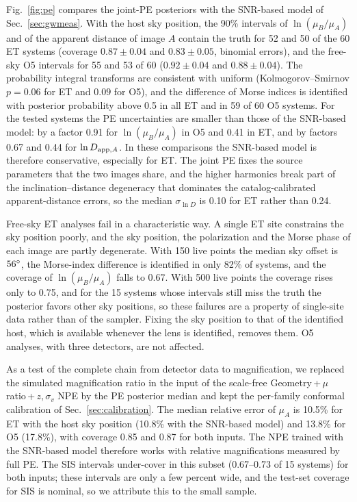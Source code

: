 Fig.~\ref{fig:pe} compares the joint-PE posteriors with the SNR-based model of Sec.~\ref{sec:gwmeas}. With the host sky position, the 90\% intervals of $\ln(\mu_B/\mu_A)$ and of the apparent distance of image $A$ contain the truth for 52 and 50 of the 60 ET systems (coverage $0.87\pm0.04$ and $0.83\pm0.05$, binomial errors), and the free-sky O5 intervals for 55 and 53 of 60 ($0.92\pm0.04$ and $0.88\pm0.04$). The probability integral transforms are consistent with uniform (Kolmogorov--Smirnov $p=0.06$ for ET and $0.09$ for O5), and the difference of Morse indices is identified with posterior probability above 0.5 in all ET and in 59 of 60 O5 systems. For the tested systems the PE uncertainties are smaller than those of the SNR-based model: by a factor 0.91 for $\ln(\mu_B/\mu_A)$ in O5 and 0.41 in ET, and by factors 0.67 and 0.44 for $\ln D_{{\rm app},A}$. In these comparisons the SNR-based model is therefore conservative, especially for ET. The joint PE fixes the source parameters that the two images share, and the higher harmonics break part of the inclination--distance degeneracy that dominates the catalog-calibrated apparent-distance errors, so the median $\sigma_{\ln D}$ is 0.10 for ET rather than 0.24.

Free-sky ET analyses fail in a characteristic way. A single ET site constrains the sky position poorly, and the sky position, the polarization and the Morse phase of each image are partly degenerate. With 150 live points the median sky offset is $56^\circ$, the Morse-index difference is identified in only 82\% of systems, and the coverage of $\ln(\mu_B/\mu_A)$ falls to 0.67. With 500 live points the coverage rises only to 0.75, and for the 15 systems whose intervals still miss the truth the posterior favors other sky positions, so these failures are a property of single-site data rather than of the sampler. Fixing the sky position to that of the identified host, which is available whenever the lens is identified, removes them. O5 analyses, with three detectors, are not affected.

As a test of the complete chain from detector data to magnification, we replaced the simulated magnification ratio in the input of the scale-free Geometry\,+\,$\mu$ ratio\,+\,$z,\sigma_v$ NPE by the PE posterior median and kept the per-family conformal calibration of Sec.~\ref{sec:calibration}. The median relative error of $\mu_A$ is 10.5\% for ET with the host sky position (10.8\% with the SNR-based model) and 13.8\% for O5 (17.8\%), with coverage 0.85 and 0.87 for both inputs. The NPE trained with the SNR-based model therefore works with relative magnifications measured by full PE. The SIS intervals under-cover in this subset (0.67--0.73 of 15 systems) for both inputs; these intervals are only a few percent wide, and the test-set coverage for SIS is nominal, so we attribute this to the small sample.

